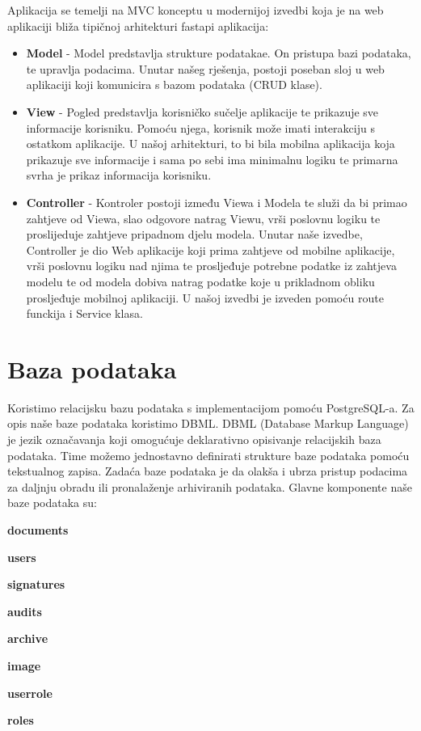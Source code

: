 		{Aplikacija se temelji na MVC konceptu u modernijoj izvedbi koja je na web aplikaciji bliža tipičnoj arhitekturi fastapi aplikacija:}
		\begin{itemize}
			\item {\textbf{Model} - Model predstavlja strukture podatakae. On pristupa bazi podataka, te upravlja podacima. Unutar našeg rješenja, postoji poseban sloj u web aplikaciji koji komunicira s bazom podataka (CRUD klase).}
			\item {\textbf{View} - Pogled predstavlja korisničko sučelje aplikacije te prikazuje sve informacije korisniku. Pomoću njega, korisnik može imati interakciju s ostatkom aplikacije. U našoj arhitekturi, to bi bila mobilna aplikacija koja prikazuje sve informacije i sama po sebi ima minimalnu logiku te primarna svrha je prikaz informacija korisniku.}
			\item {\textbf{Controller} - Kontroler postoji između Viewa i Modela te služi da bi primao zahtjeve od Viewa, slao odgovore natrag Viewu, vrši poslovnu logiku te proslijeduje zahtjeve pripadnom djelu modela. Unutar naše izvedbe, Controller je dio Web aplikacije koji prima zahtjeve od mobilne aplikacije, vrši poslovnu logiku nad njima te prosljeđuje potrebne podatke iz zahtjeva modelu te od modela dobiva natrag podatke koje u prikladnom obliku prosljeđuje mobilnoj aplikaciji. U našoj izvedbi je izveden pomoću route funckija i Service klasa.}
		\end{itemize} 
		
				

	
				
		\section{Baza podataka}
			
			
			{Koristimo relacijsku bazu podataka s implementacijom pomoću PostgreSQL-a. Za opis naše baze podataka koristimo DBML.  DBML (Database Markup Language) je jezik označavanja koji omogućuje deklarativno opisivanje relacijskih baza podataka.  Time možemo jednostavno definirati strukture baze podataka pomoću tekstualnog zapisa.  Zadaća baze podataka je da olakša i ubrza pristup podacima za daljnju obradu ili pronalaženje arhiviranih podataka. Glavne komponente naše baze podataka su:}
				\begin{packed_item}
					\item 	\textbf{documents}
					\item 	\textbf{users}
					\item 	\textbf{signatures}
					\item 	\textbf{audits}
					\item 	\textbf{archive}
					\item 	\textbf{image}
					\item 	\textbf{user\textunderscore role}
					\item	\textbf{roles}
				\end{packed_item}
		
